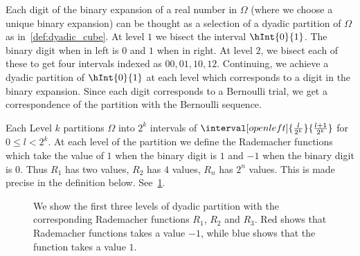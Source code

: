 Each digit of the binary expansion of a real number in $\Omega$ (where we choose a unique binary
expansion) can be thought as a selection of a dyadic partition of $\Omega$ as in~\ref{def:dyadic_cube}.
At level $1$ we bisect the interval $\hInt{0}{1}$. The binary digit when in left is $0$ and $1$
when in right. At level $2$, we bisect each of these to get four intervals indexed as $00,01,10,12$.
Continuing, we achieve a dyadic partition of $\hInt{0}{1}$ at each level which corresponds to a
digit in the binary expansion. Since each digit corresponds to a Bernoulli trial, we get a
correspondence of the partition with the Bernoulli sequence. 

Each Level $k$ partitions $\Omega$  into $2^{k}$ 
intervals of $\interval[open left]{\frac{l}{2^{k}}}{\frac{l+1}{2^{k}}}$ 
for $0 \leq l < 2^{k}$.  
At each level of the partition we
define the Rademacher functions which take the value of $1$ when the binary digit is $1$ and
$-1$ when the binary digit is $0$. Thus $R_1$ has two values, $R_2$ has $4$ values, $R_n$ has $2^n$
values. This is made precise in the definition below. See~\ref{fig:tikz:rademacher}.

\begin{figure}
  
  \caption{We show the first three levels of dyadic partition with the corresponding Rademacher
      functions $R_1$, $R_2$ and $R_3$. Red shows that Rademacher functions takes a value $-1$,
      while blue shows that the function takes a value $1$.}\label{fig:tikz:rademacher}
\end{figure}


